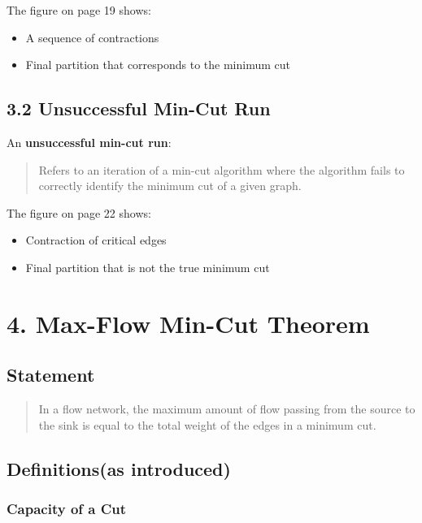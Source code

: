 \documentclass[12pt]{article}
\begin{document}
The figure on page 19 shows:

\begin{itemize}
\item A sequence of contractions
\item Final partition that corresponds to the minimum cut
\end{itemize}

\bigskip

\subsection*{3.2 Unsuccessful Min-Cut Run}

An \textbf{unsuccessful min-cut run}:

\begin{quote}
Refers to an iteration of a min-cut algorithm where the algorithm fails to correctly identify the minimum cut of a given graph.
\end{quote}

The figure on page 22 shows:

\begin{itemize}
\item Contraction of critical edges
\item Final partition that is not the true minimum cut
\end{itemize}

\bigskip

\section*{4. Max-Flow Min-Cut Theorem}

\subsection*{Statement}

\begin{quote}
In a flow network, the maximum amount of flow passing from the source to the sink is equal to the total weight of the edges in a minimum cut.
\end{quote}

\bigskip

\subsection*{Definitions(as introduced)}

\subsubsection*{Capacity of a Cut}
\end{document}
